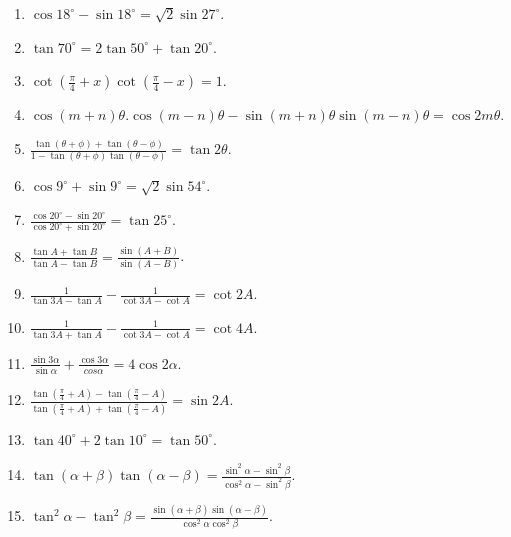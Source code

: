 \begin{enumerate}[resume]
\item $\cos 18^\circ - \sin 18^\circ = \sqrt{2}\sin 27^\circ$.

\item $\tan 70^\circ = 2\tan 50^\circ + \tan 20^\circ$.

\item $\cot\left(\frac{\pi}{4} + x\right)\cot\left(\frac{\pi}{4} - x\right) = 1$.

\item $\cos(m + n)\theta.\cos(m - n)\theta - \sin(m + n)\theta\sin(m - n)\theta = \cos 2m\theta$.

\item $\frac{\tan(\theta + \phi) + \tan(\theta - \phi)}{1 - \tan(\theta + \phi)\tan(\theta - \phi)} = \tan 2\theta$.

\item $\cos 9^\circ + \sin 9^\circ = \sqrt{2}\sin 54^\circ$.

\item $\frac{\cos 20^\circ - \sin 20^\circ}{\cos 20^\circ + \sin 20^\circ} = \tan 25^\circ$.

\item $\frac{\tan A + \tan B}{\tan A - \tan B} = \frac{\sin(A + B)}{\sin(A - B)}$.

\item $\frac{1}{\tan 3A - \tan A} - \frac{1}{\cot 3A - \cot A} = \cot 2A$.

\item $\frac{1}{\tan 3A + \tan A} - \frac{1}{\cot 3A - \cot A} = \cot 4A$.

\item $\frac{\sin 3\alpha}{\sin\alpha} + \frac{\cos 3\alpha}{cos\alpha} = 4\cos 2\alpha$.

\item $\frac{\tan\left(\frac{\pi}{4} + A \right) - \tan\left(\frac{\pi}{4} - A\right)}{\tan\left(\frac{\pi}{4} + A\right) +
    \tan\left(\frac{\pi}{4} - A\right)} = \sin 2A$.

\item $\tan 40^\circ + 2 \tan 10^\circ = \tan 50^\circ$.

\item $\tan(\alpha + \beta)\tan(\alpha - \beta) = \frac{\sin^2\alpha - \sin^2\beta}{\cos^2\alpha - \sin^2\beta}$.

\item $\tan^2\alpha -\tan^2\beta = \frac{\sin(\alpha + \beta)\sin(\alpha - \beta)}{\cos^2\alpha\cos^2\beta}$.


\end{enumerate}
